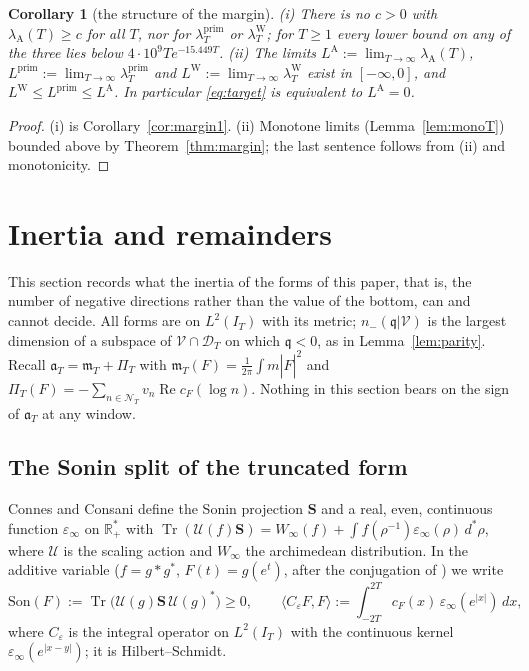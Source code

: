\documentclass[11pt]{amsart}
\newtheorem{corollary}[theorem]{Corollary}
\theoremstyle{definition}
\theoremstyle{remark}
\newcommand{\R}{\mathbb R}
\newcommand{\Rel}{\operatorname{Re}}
\newcommand{\IT}{I_T}
\newcommand{\lamP}{\lambda^{\mathrm{prim}}_T}
\newcommand{\lamW}{\lambda^{\mathrm W}_T}
\newcommand{\lamA}{\lambda_{\mathrm A}(T)}
\newcommand{\Fh}{\widehat F}
\newcommand{\cF}{c_F}
\newcommand{\NT}{\mathcal N_T}
\newcommand{\PiT}{\Pi_T}
\newcommand{\mT}{\mathfrak m_T}
\begin{document}
\begin{corollary}[the structure of the margin]\label{cor:margin2}
\emph{(i)} There is no $c>0$ with $\lamA\ge c$ for all $T$, nor for $\lamP$ or $\lamW$; for $T\ge1$ every
lower bound on any of the three lies below $4\cdot10^9Te^{-15.449T}$.
\emph{(ii)} The limits $L^{\mathrm A}:=\lim_{T\to\infty}\lamA$, $L^{\mathrm{prim}}:=\lim_{T\to\infty}\lamP$ and
$L^{\mathrm W}:=\lim_{T\to\infty}\lamW$ exist in $[-\infty,0]$, and $L^{\mathrm W}\le L^{\mathrm{prim}}\le L^{\mathrm A}$.
In particular \eqref{eq:target} is equivalent to $L^{\mathrm A}=0$.
\end{corollary}
\begin{proof}
(i) is Corollary~\ref{cor:margin1}. (ii) Monotone limits (Lemma~\ref{lem:monoT}) bounded above by
Theorem~\ref{thm:margin}; the last sentence follows from (ii) and monotonicity.
\end{proof}

\section{Inertia and remainders}\label{sec:inertia}

This section records what the inertia of the forms of this paper, that is, the number of negative
directions rather than the value of the bottom, can and cannot decide. All forms are on $L^2(\IT)$ with
its metric; $n_-(\mathfrak q|\mathcal V)$ is the largest dimension of a subspace of $\mathcal V\cap\mathcal D_T$ on which
$\mathfrak q<0$, as in Lemma~\ref{lem:parity}. Recall $\mathfrak a_T=\mT+\PiT$ with $\mT(F)=\frac1{2\pi}\int m|\Fh|^2$
and $\PiT(F)=-\sum_{n\in\NT}v_n\Rel\cF(\log n)$. Nothing in this section bears on the sign of $\mathfrak a_T$ at any
window.

\subsection{The Sonin split of the truncated form}
Connes and Consani \cite[Thm.~4.7, (83)--(84)]{ConnesConsani2021} define the Sonin projection $\mathbf S$ and a
real, even, continuous function $\varepsilon_\infty$ on $\R_+^*$ with
$\operatorname{Tr}(\mathcal U(f)\mathbf S)=W_\infty(f)+\int f(\rho^{-1})\varepsilon_\infty(\rho)\,d^*\rho$, where $\mathcal U$ is the
scaling action and $W_\infty$ the archimedean distribution. In the additive variable ($f=g*g^*$, $F(t)=g(e^t)$,
after the conjugation of \cite[App.~A]{ConnesConsani2021}) we write
\[
\mathrm{Son}(F):=\operatorname{Tr}\big(\mathcal U(g)\mathbf S\,\mathcal U(g)^*\big)\ge0,\qquad
\langle C_\varepsilon F,F\rangle:=\int_{-2T}^{2T}\cF(x)\,\varepsilon_\infty(e^{|x|})\,dx ,
\]
where $C_\varepsilon$ is the integral operator on $L^2(\IT)$ with the continuous kernel $\varepsilon_\infty(e^{|x-y|})$; it
is Hilbert--Schmidt.
\end{document}
